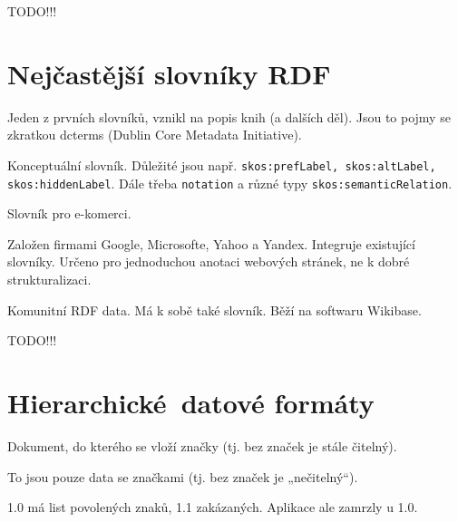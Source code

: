 \documentclass[12pt]{article}					%
\begin{document}
TODO!!!


\section{Nejčastější slovníky RDF}
\begin{definice}
	Jeden z prvních slovníků, vznikl na popis knih (a dalších děl). Jsou to pojmy se zkratkou dcterms (Dublin Core Metadata Initiative).
\end{definice}

\begin{definice}[skos]
	Konceptuální slovník. Důležité jsou např. \verb|skos:prefLabel, skos:altLabel, skos:hiddenLabel|. Dále třeba \verb|notation| a různé typy \verb|skos:semanticRelation|.
\end{definice}

\begin{definice}[GoodRelations]
	Slovník pro e-komerci.
\end{definice}

\begin{definice}
	Založen firmami Google, Microsofte, Yahoo a Yandex. Integruje existující slovníky. Určeno pro jednoduchou anotaci webových stránek, ne k dobré strukturalizaci.
\end{definice}

\begin{definice}[Wikidata]
	Komunitní RDF data. Má k sobě také slovník. Běží na softwaru Wikibase.
\end{definice}

TODO!!!



\section{Hierarchické datové formáty}
\begin{definice}
	Dokument, do kterého se vloží značky (tj. bez značek je stále čitelný).
\end{definice}

\begin{definice}
	To jsou pouze data se značkami (tj. bez značek je „nečitelný“).
\end{definice}

\begin{definice}
	1.0 má list povolených znaků, 1.1 zakázaných. Aplikace ale zamrzly u 1.0.
\end{definice}
\end{document}
